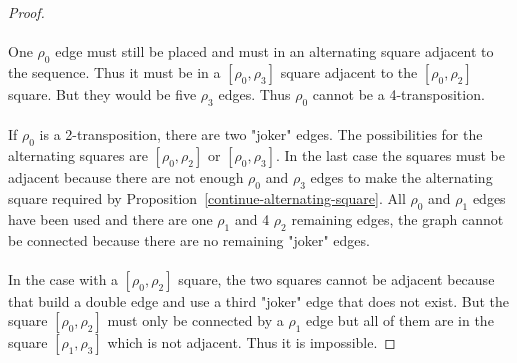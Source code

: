 \begin{proof}
\begin{figure}[H]
\begin{center}
      \caption{}
    \end{center}
  \end{figure}

  \paragraph{}
  One $\rho_0$ edge must still be placed and must in an alternating square adjacent to the sequence. Thus it must be in a $[\rho_0, \rho_3]$ square adjacent to the $[\rho_0, \rho_2]$ square. But they would be five $\rho_3$ edges. Thus $\rho_0$ cannot be a 4-transposition.

  \paragraph{}
  If $\rho_0$ is a 2-transposition, there are two "joker" edges. The possibilities for the alternating squares are $[\rho_0, \rho_2]$ or $[\rho_0, \rho_3]$. In the last case the squares must be adjacent because there are not enough $\rho_0$ and $\rho_3$ edges to make the alternating square required by Proposition~\ref{continue-alternating-square}. All $\rho_0$ and $\rho_1$ edges have been used and there are one $\rho_1$ and 4 $\rho_2$ remaining edges, the graph cannot be connected because there are no remaining "joker" edges.

  \paragraph{}
  In the case with a $[\rho_0, \rho_2]$ square, the two squares cannot be adjacent because that build a double edge and use a third "joker" edge that does not exist. But the square $[\rho_0, \rho_2]$ must only be connected by a $\rho_1$ edge but all of them are in the square $[\rho_1, \rho_3]$ which is not adjacent. Thus it is impossible.


\end{proof}
